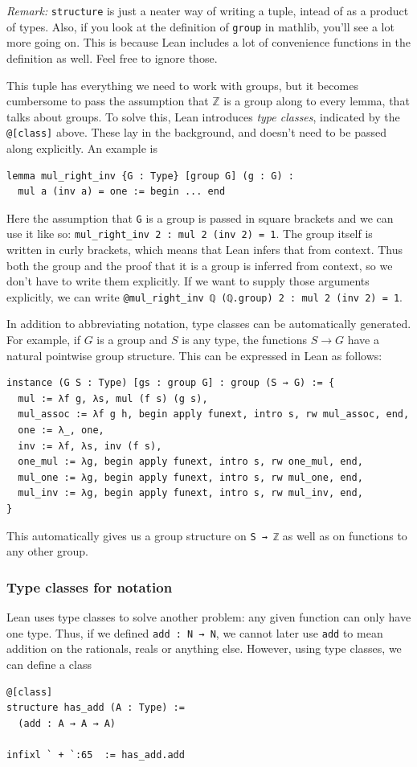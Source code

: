 \documentclass[a4paper, 12pt]{article}
\newcommand{\Z}{\mathbb{Z}}
\newcommand{\lean}[1]{\texttt{#1}}
\theoremstyle{changedot}
\theoremstyle{changedotbreak}
\theoremstyle{nonumberplain}
\begin{document}
\textit{Remark:} \lean{structure} is just a neater way of writing a tuple, intead of as a product of types. Also, if you look at the definition of \lean{group} in mathlib, you'll see a lot more going on. This is because Lean includes a lot of convenience functions in the definition as well. Feel free to ignore those.

This tuple has everything we need to work with groups, but it becomes cumbersome to pass the assumption that $\Z$ is a group along to every lemma, that talks about groups. To solve this, Lean introduces \textit{type classes}, indicated by the \lean{@[class]} above. These lay in the background, and doesn't need to be passed along explicitly. An example is
\begin{verbatim}
lemma mul_right_inv {G : Type} [group G] (g : G) :
  mul a (inv a) = one := begin ... end
\end{verbatim}
Here the assumption that \lean{G} is a group is passed in square brackets and we can use it like so: \lean{mul_right_inv 2 : mul 2 (inv 2) = 1}. The group itself is written in curly brackets, which means that Lean infers that from context. Thus both the group and the proof that it is a group is inferred from context, so we don't have to write them explicitly. If we want to supply those arguments explicitly, we can write \lean{@mul_right_inv ℚ (ℚ.group) 2 : mul 2 (inv 2) = 1}.

In addition to abbreviating notation, type classes can be automatically generated. For example, if $G$ is a group and $S$ is any type, the functions $S \to G$ have a natural pointwise group structure. This can be expressed in Lean as follows:

\begin{verbatim}
instance (G S : Type) [gs : group G] : group (S → G) := {
  mul := λf g, λs, mul (f s) (g s),
  mul_assoc := λf g h, begin apply funext, intro s, rw mul_assoc, end,
  one := λ_, one,
  inv := λf, λs, inv (f s),
  one_mul := λg, begin apply funext, intro s, rw one_mul, end,
  mul_one := λg, begin apply funext, intro s, rw mul_one, end,
  mul_inv := λg, begin apply funext, intro s, rw mul_inv, end,
}
\end{verbatim}

This automatically gives us a group structure on \lean{S → ℤ} as well as on functions to any other group. 

\subsubsection{Type classes for notation}
Lean uses type classes to solve another problem: any given function can only have one type. Thus, if we defined \lean{add : N → N}, we cannot later use \lean{add} to mean addition on the rationals, reals or anything else. However, using type classes, we can define a class
\begin{verbatim}
@[class]
structure has_add (A : Type) :=
  (add : A → A → A)

infixl ` + `:65  := has_add.add
\end{verbatim}
\end{document}
